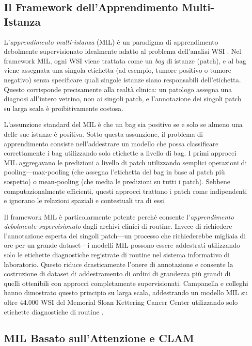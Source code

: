 \subsection{Il Framework dell'Apprendimento Multi-Istanza}

L'\emph{apprendimento multi-istanza} (MIL) è un paradigma di apprendimento debolmente supervisionato idealmente adatto al problema dell'analisi WSI \cite{lu2020}. Nel framework MIL, ogni WSI viene trattata come un \emph{bag} di istanze (patch), e al bag viene assegnata una singola etichetta (ad esempio, tumore-positivo o tumore-negativo) senza specificare quali singole istanze siano responsabili dell'etichetta. Questo corrisponde precisamente alla realtà clinica: un patologo assegna una diagnosi all'intero vetrino, non ai singoli patch, e l'annotazione dei singoli patch su larga scala è proibitivamente costosa.

L'assunzione standard del MIL è che un bag sia positivo se e solo se almeno una delle sue istanze è positiva. Sotto questa assunzione, il problema di apprendimento consiste nell'addestrare un modello che possa classificare correttamente i bag utilizzando solo etichette a livello di bag. I primi approcci MIL aggregavano le predizioni a livello di patch utilizzando semplici operazioni di pooling---max-pooling (che assegna l'etichetta del bag in base al patch più sospetto) o mean-pooling (che media le predizioni su tutti i patch). Sebbene computazionalmente efficienti, questi approcci trattano i patch come indipendenti e ignorano le relazioni spaziali e contestuali tra di essi.

Il framework MIL è particolarmente potente perché consente l'\emph{apprendimento debolmente supervisionato} dagli archivi clinici di routine. Invece di richiedere l'annotazione esperta dei singoli patch---un processo che richiederebbe migliaia di ore per un grande dataset---i modelli MIL possono essere addestrati utilizzando solo le etichette diagnostiche registrate di routine nel sistema informativo di laboratorio. Questo riduce drasticamente l'onere di annotazione e consente la costruzione di dataset di addestramento di ordini di grandezza più grandi di quelli ottenibili con approcci completamente supervisionati. Campanella e colleghi hanno dimostrato questo principio su larga scala, addestrando un modello MIL su oltre 44.000 WSI del Memorial Sloan Kettering Cancer Center utilizzando solo etichette diagnostiche di routine \cite{campanella2019}.

\subsection{MIL Basato sull'Attenzione e CLAM}

